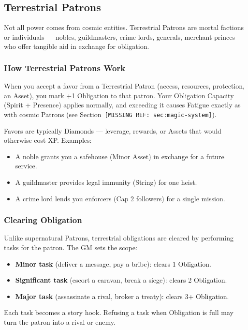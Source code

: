 \subsection{Terrestrial Patrons}

Not all power comes from cosmic entities. Terrestrial Patrons are mortal factions or individuals --- nobles, guildmasters, crime lords, generals, merchant princes --- who offer tangible aid in exchange for obligation.

\subsubsection{How Terrestrial Patrons Work}
When you accept a favor from a Terrestrial Patron (access, resources, protection, an Asset), you mark +1 Obligation to that patron. Your Obligation Capacity (Spirit + Presence) applies normally, and exceeding it causes Fatigue exactly as with cosmic Patrons (see Section~\texttt{[MISSING REF: sec:magic-system]}).

Favors are typically Diamonds --- leverage, rewards, or Assets that would otherwise cost XP. Examples:
\begin{itemize}
  \item A noble grants you a safehouse (Minor Asset) in exchange for a future service.
  \item A guildmaster provides legal immunity (String) for one heist.
  \item A crime lord lends you enforcers (Cap 2 followers) for a single mission.
\end{itemize}

\subsubsection{Clearing Obligation}
Unlike supernatural Patrons, terrestrial obligations are cleared by performing tasks for the patron. The GM sets the scope:
\begin{itemize}
  \item \textbf{Minor task} (deliver a message, pay a bribe): clears 1 Obligation.
  \item \textbf{Significant task} (escort a caravan, break a siege): clears 2 Obligation.
  \item \textbf{Major task} (assassinate a rival, broker a treaty): clears 3+ Obligation.
\end{itemize}
Each task becomes a story hook. Refusing a task when Obligation is full may turn the patron into a rival or enemy.

